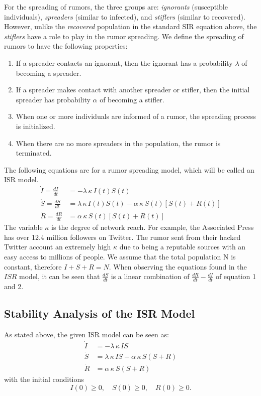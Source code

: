 \documentclass[11pt]{article}
\begin{document}
For the spreading of rumors, the three groups are: \textit{ignorants} (susceptible individuals), \textit{spreaders} (similar to infected), and \textit{stiflers} (similar to recovered). However, unlike the \textit{recovered} population in the standard SIR equation above, the \textit{stiflers} have a role to play in the rumor spreading.  We define the spreading of rumors to have the following properties: 
\begin{enumerate}
\item If a spreader contacts an ignorant, then the ignorant has a probability $\lambda$ of becoming a spreader.
\item If a spreader makes contact with another spreader or stifler, then the initial spreader has probability $\alpha$ of becoming a stifler.
\item When one or more individuals are informed of a rumor, the spreading process is initialized. 
\item When there are no more spreaders in the population, the rumor is terminated. 

\end{enumerate}
The following equations are for a rumor spreading model, which will be called an ISR model.
	\begin{align}
    \dot{I} = \frac{dI}{dt} &= -\lambda\,\kappa\,I(t)S(t) \\
    \dot{S} = \frac{dS}{dt} &=  \lambda\,\kappa\,I(t)S(t)-\alpha\,\kappa\,S(t) \left[ S(t)+R(t) \right] 
 \\
    \dot{R} = \frac{dR}{dt} &=  \alpha\,\kappa\,S(t) \left[ S(t)+R(t) \right] 
    \end{align}
The variable $\kappa$ is the degree of network reach. For example, the Associated Press has over 12.4 million followers on Twitter. The rumor sent from their hacked Twitter account an extremely high $\kappa$ due to being a reputable sources with an easy access to millions of people. 
We assume that the total population N is constant, therefore $I + S + R = N$. When observing the equations found in the $ISR$ model, it can be seen that $\frac{dS}{dt}$ is a linear combination of $\frac{dR}{dt} - \frac{dI}{dt}$ of equation 1 and 2.
\subsection{Stability Analysis of the ISR Model}
As stated above, the given ISR model can be seen as: 	
    \begin{align*}
    \dot{I} &= -\lambda\,\kappa\,IS \\
    \dot{S} &=  \lambda\,\kappa\,IS-\alpha\,\kappa\,S \left( S+R \right) 
 \\
    \dot{R} &=  \alpha\,\kappa\,S \left( S+R \right) 
    \end{align*}
with the initial conditions
\begin{equation*}
I(0) \geq 0, \quad  S(0) \geq 0, \quad  R(0) \geq 0.
\end{equation*}
\end{document}

